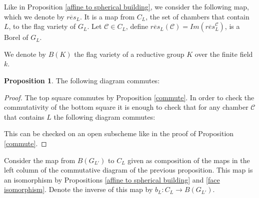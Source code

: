 \documentclass[12pt]{article}
\newcommand{\C}{\mathcal{C}}
\newcommand{\<}{\langle}
\renewcommand{\>}{\rangle}
\theoremstyle{plain}
\theoremstyle{definition}
\newtheorem{prop}[theorem]{Proposition}
\begin{document}
Like in Proposition \ref{affine to spherical building}, we consider the following map, which we denote by $\overline{res}_L$. It is a map from $C_L$, the set of chambers that contain $L$, to the flag variety of $G_L$. Let $\C\in C_L$, define $\overline{res}_L(\C)=Im(\overline{res}^{\C}_{L})$, is a Borel of $G_L$. 

We denote by $B(K)$ the flag variety of a reductive group $K$ over the finite field $k$.

\begin{prop}\label{commutative diagram}
    The following diagram commutes:

\begin{center}
    
    
\end{center}


\end{prop}

\begin{proof}
    The top square commutes by Proposition \ref{commute}. In order to check the commutativity of the bottom square it is enough to check that for any chamber $\C$ that contains $L$ the following diagram commutes:
\begin{center}
    

\end{center}

This can be checked on an open subscheme like in the proof of Proposition \ref{commute}.
    
\end{proof}

Consider the map from $B(G_{L'})$ to $C_L$ given as composition of the maps in the left column of the commutative diagram of the previous proposition. This map is an isomorphism by Propositions \ref{affine to spherical building} and \ref{face isomorphism}. Denote the inverse of this map by $b_L:C_L\rightarrow B(G_{L'})$.
\end{document}
